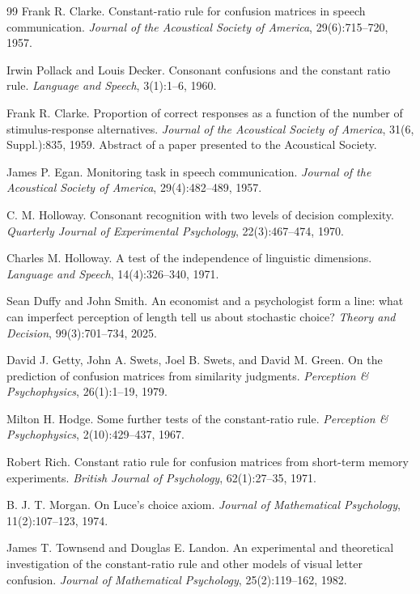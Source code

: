 \documentclass[11pt]{article}
\theoremstyle{italichead}
\begin{document}
\begin{thebibliography}{99}
Frank R. Clarke.
Constant-ratio rule for confusion matrices in speech communication.
\emph{Journal of the Acoustical Society of America}, 29(6):715--720, 1957.

Irwin Pollack and Louis Decker.
Consonant confusions and the constant ratio rule.
\emph{Language and Speech}, 3(1):1--6, 1960.

Frank R. Clarke.
Proportion of correct responses as a function of the number of stimulus-response
alternatives.
\emph{Journal of the Acoustical Society of America}, 31(6, Suppl.):835, 1959.
Abstract of a paper presented to the Acoustical Society.

James P. Egan.
Monitoring task in speech communication.
\emph{Journal of the Acoustical Society of America}, 29(4):482--489, 1957.

C. M. Holloway.
Consonant recognition with two levels of decision complexity.
\emph{Quarterly Journal of Experimental Psychology}, 22(3):467--474, 1970.

Charles M. Holloway.
A test of the independence of linguistic dimensions.
\emph{Language and Speech}, 14(4):326--340, 1971.

Sean Duffy and John Smith.
An economist and a psychologist form a line: what can imperfect perception of length tell us
about stochastic choice?
\emph{Theory and Decision}, 99(3):701--734, 2025.

David J. Getty, John A. Swets, Joel B. Swets, and David M. Green.
On the prediction of confusion matrices from similarity judgments.
\emph{Perception \& Psychophysics}, 26(1):1--19, 1979.

Milton H. Hodge.
Some further tests of the constant-ratio rule.
\emph{Perception \& Psychophysics}, 2(10):429--437, 1967.

Robert Rich.
Constant ratio rule for confusion matrices from short-term memory experiments.
\emph{British Journal of Psychology}, 62(1):27--35, 1971.

B. J. T. Morgan.
On Luce's choice axiom.
\emph{Journal of Mathematical Psychology}, 11(2):107--123, 1974.

James T. Townsend and Douglas E. Landon.
An experimental and theoretical investigation of the constant-ratio rule and other models
of visual letter confusion.
\emph{Journal of Mathematical Psychology}, 25(2):119--162, 1982.


\end{thebibliography}
\end{document}
